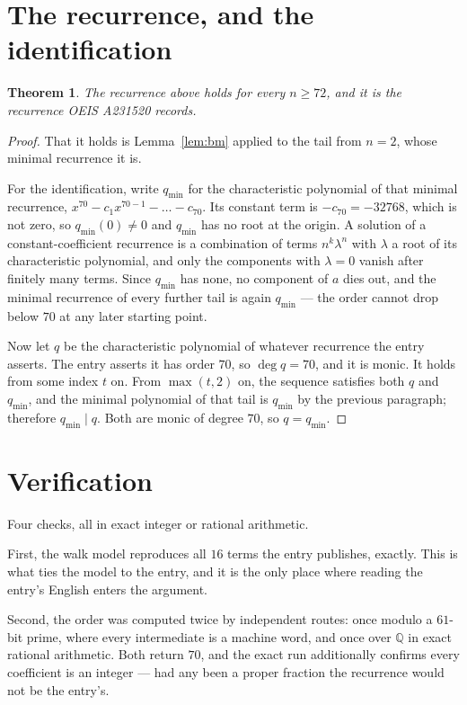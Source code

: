 \documentclass[11pt,a4paper]{article}
\theoremstyle{plain}
\newtheorem{theorem}{Theorem}
\theoremstyle{definition}
\begin{document}
\section{The recurrence, and the identification}

\begin{theorem}
The recurrence above holds for every $n\ge72$, and it is the recurrence OEIS A231520 records.
\end{theorem}

\begin{proof}
That it holds is Lemma~\ref{lem:bm} applied to the tail from $n=2$, whose minimal
recurrence it is.

For the identification, write $q_{\min}$ for the characteristic polynomial of that minimal
recurrence, $x^{70}-c_1x^{70-1}-\dots-c_{70}$. Its constant term is
$-c_{70}=-32768$, which is not zero, so $q_{\min}(0)\neq0$ and $q_{\min}$ has no
root at the origin. A solution of a constant-coefficient recurrence is a combination of terms
$n^{k}\lambda^{n}$ with $\lambda$ a root of its characteristic polynomial, and only the
components with $\lambda=0$ vanish after finitely many terms. Since $q_{\min}$ has none, no
component of $a$ dies out, and the minimal recurrence of every further tail is again
$q_{\min}$ --- the order cannot drop below $70$ at any later starting point.

Now let $q$ be the characteristic polynomial of whatever recurrence the entry asserts. The
entry asserts it has order $70$, so $\deg q=70$, and it is monic. It holds from some
index $t$ on. From $\max(t,2)$ on, the sequence satisfies both $q$ and $q_{\min}$, and
the minimal polynomial of that tail is $q_{\min}$ by the previous paragraph; therefore
$q_{\min}\mid q$. Both are monic of degree $70$, so $q=q_{\min}$.
\end{proof}

\section{Verification}

Four checks, all in exact integer or rational arithmetic.

First, the walk model reproduces all $16$ terms the entry publishes, exactly. This is
what ties the model to the entry, and it is the only place where reading the entry's English
enters the argument.

Second, the order was computed twice by independent routes: once modulo a $61$-bit prime, where
every intermediate is a machine word, and once over $\mathbb{Q}$ in exact rational arithmetic.
Both return $70$, and the exact run additionally confirms every coefficient is an integer
--- had any been a proper fraction the recurrence would not be the entry's.
\end{document}

